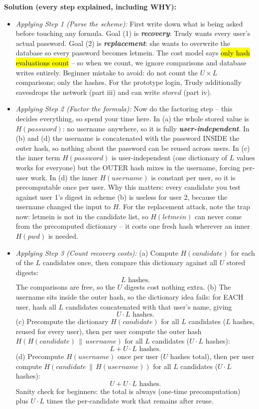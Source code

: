 \documentclass[12pt, a4paper]{article}
\newcommand{\term}[1]{\textbf{\textit{#1}}}        %
\newcommand{\imp}[1]{\hl{#1}}                       %
\begin{document}
\textbf{Solution (every step explained, including WHY):}
\begin{itemize}
    \item \textit{Applying Step 1 (Parse the scheme):} First write down what is being asked before touching any formula. Goal (1) is \term{recovery}: Trudy wants every user's actual password. Goal (2) is \term{replacement}: she wants to overwrite the database so every password becomes letmein. The cost model says \imp{only hash evaluations count} -- so when we count, we ignore comparisons and database writes entirely. Beginner mistake to avoid: do not count the $U \times L$ comparisons; only the hashes. For the prototype login, Trudy additionally eavesdrops the network (part iii) and can write $stored$ (part iv).
    \item \textit{Applying Step 2 (Factor the formula):} Now do the factoring step -- this decides everything, so spend your time here. In (a) the whole stored value is $H(password)$: no username anywhere, so it is fully \term{user-independent}. In (b) and (d) the username is concatenated with the password INSIDE the outer hash, so nothing about the password can be reused across users. In (c) the inner term $H(password)$ is user-independent (one dictionary of $L$ values works for everyone) but the OUTER hash mixes in the username, forcing per-user work. In (d) the inner $H(username)$ is constant per user, so it is precomputable once per user. Why this matters: every candidate you test against user 1's digest in scheme (b) is useless for user 2, because the username changed the input to $H$. For the replacement attack, note the trap now: letmein is not in the candidate list, so $H(letmein)$ can never come from the precomputed dictionary -- it costs one fresh hash wherever an inner $H(pwd)$ is needed.
    \item \textit{Applying Step 3 (Count recovery costs):} (a) Compute $H(candidate)$ for each of the $L$ candidates once, then compare this dictionary against all $U$ stored digests: \[ L \text{ hashes.} \] The comparisons are free, so the $U$ digests cost nothing extra. (b) The username sits inside the outer hash, so the dictionary idea fails: for EACH user, hash all $L$ candidates concatenated with that user's name, giving \[ U \cdot L \text{ hashes.} \] (c) Precompute the dictionary $H(candidate)$ for all $L$ candidates ($L$ hashes, reused for every user), then per user compute the outer hash $H(H(candidate) \,\|\, username)$ for all $L$ candidates ($U \cdot L$ hashes): \[ L + U \cdot L \text{ hashes.} \] (d) Precompute $H(username)$ once per user ($U$ hashes total), then per user compute $H(candidate \,\|\, H(username))$ for all $L$ candidates ($U \cdot L$ hashes): \[ U + U \cdot L \text{ hashes.} \] Sanity check for beginners: the total is always (one-time precomputation) plus $U \cdot L$ times the per-candidate work that remains after reuse.

\end{itemize}
\end{document}
